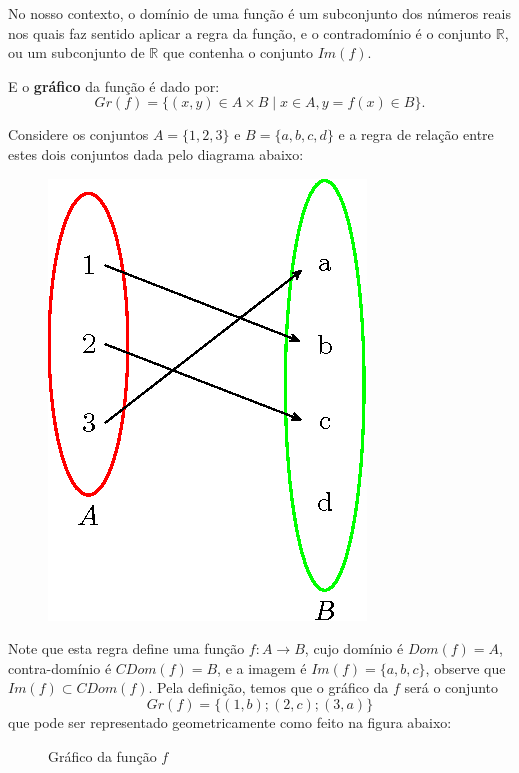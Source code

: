 No nosso contexto, o domínio de uma função é um subconjunto dos números reais nos quais faz sentido aplicar a regra da função, e o contradomínio é o conjunto $\mathbb{R}$, ou um subconjunto de $\mathbb{R}$ que contenha o conjunto $Im(f)$.

E o \textbf{gráfico} da função é dado por:
\begin{equation}
Gr(f) = \{ (x, y) \in A \times B \mid x \in A, y = f(x) \in B\} .
\end{equation}

\begin{exem}
 Considere os conjuntos $A= \{1, 2, 3\}$ e $B= \{a, b, c, d\}$ e a regra de relação entre estes dois conjuntos dada pelo diagrama abaixo:

 \begin{figure}[H]
 \centering
 \includegraphics{cap_funcao/figs/tikz/figura_cap_funcao_7}
\end{figure}

Note que esta regra define uma função $f: A \rightarrow B$, cujo domínio é $Dom(f) = A$, contra-domínio é $CDom(f) = B$, e a imagem é $Im(f)= \{a, b, c\}$, observe que $Im(f) \subset CDom(f)$. Pela definição, temos que o gráfico da $f$ será o conjunto
\[
Gr(f)= \{(1, b); (2, c); (3, a)\}
\]
que pode ser representado geometricamente como feito na figura abaixo:

\begin{figure}[H]
 \centering
    \caption{Gráfico da função $f$}
  \end{figure}

\end{exem}

